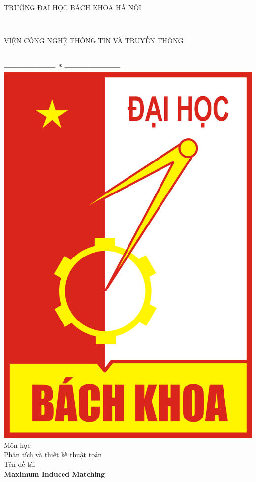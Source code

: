 \documentclass[14pt,a4paper]{extreport}
\begin{document}
	\thispagestyle{empty}
\thisfancypage{
	\setlength{\fboxsep}{10pt}
	\fbox}{}
\begin{center}
	\begin{large}
		TRƯỜNG ĐAI HỌC BÁCH KHOA HÀ NỘI
	\end{large} \\
	\begin{large}
		VIỆN CÔNG NGHỆ THÔNG TIN VÀ TRUYỀN THÔNG
	\end{large} \\
	
	\textbf{--------------------  *  ---------------------}\\[1.5cm]
	\includegraphics[scale=0.25]{12}
	\\
	\vspace{1.5cm}
	{\fontsize{17pt}{1}\selectfont  Môn học}\\[0.3cm]
	{\fontsize{20pt}{1}\selectfont 	Phân tích và thiết kế thuật toán}\\[0.9cm]
	{\fontsize{17pt}{1}\selectfont  Tên đề tài}\\[0.5cm]
	{\fontsize{23pt}{1}\selectfont \textbf{Maximum Induced Matching}}\\[1.3cm]
\end{center}
\end{document}

